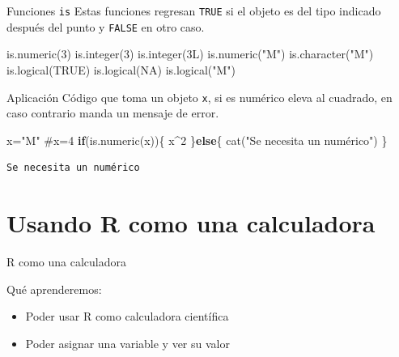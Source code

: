 \documentclass[
  ignorenonframetext,
  aspectratio=169,
  spanish,
]{beamer}
\newenvironment{Shaded}{\begin{snugshade}}{\end{snugshade}}
\newcommand{\CommentTok}[1]{\textcolor[rgb]{0.37,0.37,0.37}{#1}}
\newcommand{\ConstantTok}[1]{\textcolor[rgb]{0.56,0.35,0.01}{#1}}
\newcommand{\ControlFlowTok}[1]{\textcolor[rgb]{0.00,0.23,0.31}{\textbf{#1}}}
\newcommand{\DecValTok}[1]{\textcolor[rgb]{0.68,0.00,0.00}{#1}}
\newcommand{\FunctionTok}[1]{\textcolor[rgb]{0.28,0.35,0.67}{#1}}
\newcommand{\NormalTok}[1]{\textcolor[rgb]{0.00,0.23,0.31}{#1}}
\newcommand{\OtherTok}[1]{\textcolor[rgb]{0.00,0.23,0.31}{#1}}
\newcommand{\SpecialCharTok}[1]{\textcolor[rgb]{0.37,0.37,0.37}{#1}}
\newcommand{\StringTok}[1]{\textcolor[rgb]{0.13,0.47,0.30}{#1}}
\providecommand{\tightlist}{%
  \setlength{\itemsep}{0pt}\setlength{\parskip}{0pt}}
\begin{document}
\begin{frame}[fragile]{Funciones \texttt{is}}
\label{funciones-is}
Estas funciones regresan \texttt{TRUE} si el objeto es del tipo indicado
después del punto y \texttt{FALSE} en otro caso.

\begin{Shaded}
\begin{Highlighting}[]
\FunctionTok{is.numeric}\NormalTok{(}\DecValTok{3}\NormalTok{)}
\FunctionTok{is.integer}\NormalTok{(}\DecValTok{3}\NormalTok{) }
\FunctionTok{is.integer}\NormalTok{(}\DecValTok{3}\NormalTok{L)}
\FunctionTok{is.numeric}\NormalTok{(}\StringTok{"M"}\NormalTok{)}
\FunctionTok{is.character}\NormalTok{(}\StringTok{"M"}\NormalTok{)}
\FunctionTok{is.logical}\NormalTok{(}\ConstantTok{TRUE}\NormalTok{)}
\FunctionTok{is.logical}\NormalTok{(}\ConstantTok{NA}\NormalTok{)}
\FunctionTok{is.logical}\NormalTok{(}\StringTok{"M"}\NormalTok{)}
\end{Highlighting}
\end{Shaded}
\end{frame}

\begin{frame}[fragile]{Aplicación}
\label{aplicaciuxf3n}
Código que toma un objeto \texttt{x}, si es numérico eleva al cuadrado,
en caso contrario manda un mensaje de error.

\begin{Shaded}
\begin{Highlighting}[numbers=left,,]
\NormalTok{x}\OtherTok{=}\StringTok{"M"}
\CommentTok{\#x=4}
\ControlFlowTok{if}\NormalTok{(}\FunctionTok{is.numeric}\NormalTok{(x))\{}
\NormalTok{x}\SpecialCharTok{\^{}}\DecValTok{2}  
\NormalTok{\}}\ControlFlowTok{else}\NormalTok{\{ }\FunctionTok{cat}\NormalTok{(}\StringTok{"Se necesita un numérico"}\NormalTok{)}
\NormalTok{\}}
\end{Highlighting}
\end{Shaded}

\begin{verbatim}
Se necesita un numérico
\end{verbatim}
\end{frame}

\section{Usando R como una
calculadora}\label{usando-r-como-una-calculadora}

\begin{frame}{R como una calculadora}
\label{r-como-una-calculadora}
\begin{block}{Qué aprenderemos:}
\label{quuxe9-aprenderemos}
\begin{itemize}
\tightlist
\item
  Poder usar R como calculadora científica
\item
  Poder asignar una variable y ver su valor
\end{itemize}
\end{block}
\end{frame}
\end{document}
